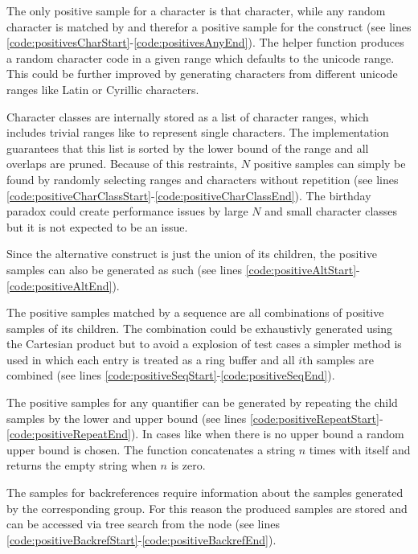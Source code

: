 The only positive sample for a character is that character, while any random character is matched by and therefor a positive sample for the  construct (see lines \ref{code:positivesCharStart}-\ref{code:positivesAnyEnd}). The helper function  produces a random character code in a given range which defaults to the unicode range. This could be further improved by generating characters from different unicode ranges like Latin or Cyrillic characters.

Character classes are internally stored as a list of character ranges, which includes trivial ranges like \pattern{[a-a]} to represent single characters. The implementation guarantees that this list is sorted by the lower bound of the range and all overlaps are pruned. Because of this restraints, $N$ positive samples can simply be found by randomly selecting ranges and characters without repetition (see lines \ref{code:positiveCharClassStart}-\ref{code:positiveCharClassEnd}). The birthday paradox could create performance issues by large $N$ and small character classes but it is not expected to be an issue.

Since the alternative construct is just the union of its children, the positive samples can also be generated as such (see lines \ref{code:positiveAltStart}-\ref{code:positiveAltEnd}).

The positive samples matched by a sequence are all combinations of positive samples of its children. The combination could be exhaustivly generated using the Cartesian product but to avoid a explosion of test cases a simpler method is used in which each entry is treated as a ring buffer and all $i$th samples are combined (see lines \ref{code:positiveSeqStart}-\ref{code:positiveSeqEnd}).

The positive samples for any quantifier can be generated by repeating the child samples by the lower and upper bound (see lines \ref{code:positiveRepeatStart}-\ref{code:positiveRepeatEnd}). In cases like  when there is no upper bound a random upper bound is chosen. The function  concatenates a string $n$ times with itself and returns the empty string when $n$ is zero.

The samples for backreferences require information about the samples generated by the corresponding group. For this reason the produced samples are stored and can be accessed via tree search from the  node (see lines \ref{code:positiveBackrefStart}-\ref{code:positiveBackrefEnd}).

